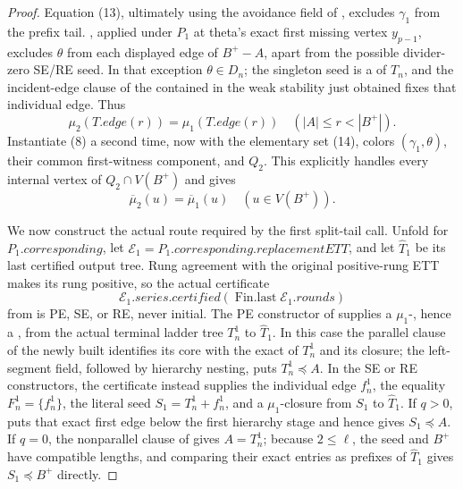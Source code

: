 \begin{proof}
Equation (13), ultimately using the avoidance field of
, excludes \(\gamma_1\) from the prefix tail.
, applied under \(P_1\) at
theta's exact first missing vertex \(y_{p-1}\), excludes \(\theta\) from
each displayed edge of \(B^+-A\), apart from the possible divider-zero
SE/RE seed.  In that exception \(\theta\in D_n\); the singleton seed is a
 of \(T_n\), and the incident-edge clause of the
 contained in the weak stability just obtained
fixes that individual edge.  Thus
\[
 \mu_2(T.\mathit{edge}(r))=\mu_1(T.\mathit{edge}(r))
                 \quad(|A|\le r<|B^+|).                       \tag{16}
\]
Instantiate (8) a second time, now with the elementary set (14), colors
\((\gamma_1,\theta)\), their common first-witness component, and \(Q_2\).
This explicitly handles every internal vertex of \(Q_2\cap V(B^+)\) and
gives
\[
 \overline\mu_2(u)=\overline\mu_1(u)
                           \quad(u\in V(B^+)).                 \tag{17}
\]

We now construct the actual route required by the first split-tail call.
Unfold  for
\(P_1.\mathit{corresponding}\), let
\(\mathcal E_1=P_1.\mathit{corresponding}.\mathit{replacementETT}\), and
let \(\widehat T_1\) be its last certified output tree.  Rung agreement
with the original positive-rung ETT makes its rung positive, so the actual
certificate
\[
 \mathcal E_1.\mathit{series}.\mathit{certified}
       (\operatorname{Fin.last}\mathcal E_1.\mathit{rounds})
\]
from  is PE, SE, or RE, never initial.
The PE constructor of  supplies a
\(\mu_1\)-, hence a
, from the actual terminal ladder
tree \(T_n^1\) to \(\widehat T_1\).  In this case the parallel clause of
the newly built  identifies its core with the exact
 of \(T_n^1\) and its closure; the left-segment
field, followed by hierarchy nesting, puts \(T_n^1\preccurlyeq A\).
In the SE or RE constructors, the certificate instead supplies the
individual edge \(f_n^1\), the equality \(F_n^1=\{f_n^1\}\), the literal
 seed \(S_1=T_n^1+f_n^1\), and a
\(\mu_1\)-closure from \(S_1\) to \(\widehat T_1\).  If \(q>0\),
 puts that exact first edge below
the first hierarchy stage and hence gives \(S_1\preccurlyeq A\).  If
\(q=0\), the nonparallel clause of  gives
\(A=T_n^1\); because \(2\le\ell\), the seed and \(B^+\) have compatible
lengths, and comparing their exact entries as prefixes of \(\widehat T_1\)
gives \(S_1\preccurlyeq B^+\) directly.


\end{proof}
